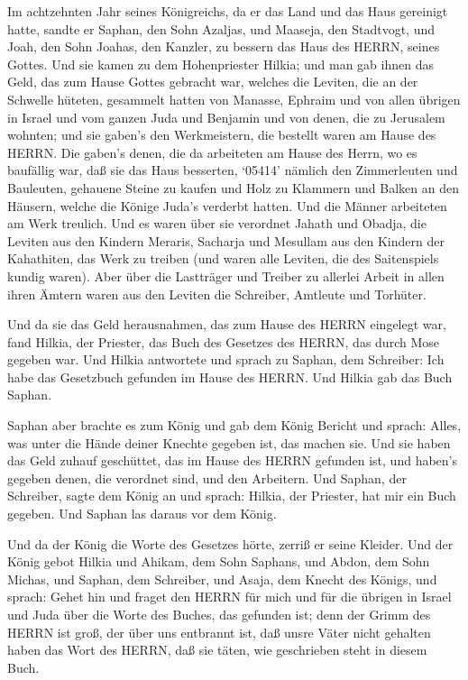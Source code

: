  Im achtzehnten Jahr seines Königreichs, da er das Land und
das Haus gereinigt hatte, sandte er Saphan, den Sohn Azaljas, und
Maaseja, den Stadtvogt, und Joah, den Sohn Joahas, den Kanzler, zu
bessern das Haus des HERRN, seines Gottes.  Und sie kamen zu
dem Hohenpriester Hilkia; und man gab ihnen das Geld, das zum Hause
Gottes gebracht war, welches die Leviten, die an der Schwelle hüteten,
gesammelt hatten von Manasse, Ephraim und von allen übrigen in Israel
und vom ganzen Juda und Benjamin und von denen, die zu Jerusalem
wohnten;  und sie gaben's den Werkmeistern, die bestellt
waren am Hause des HERRN. Die gaben's denen, die da arbeiteten am Hause
des Herrn, wo es baufällig war, daß sie das Haus besserten,
 `05414' nämlich den Zimmerleuten und Bauleuten, gehauene
Steine zu kaufen und Holz zu Klammern und Balken an den Häusern, welche
die Könige Juda's verderbt hatten.  Und die Männer
arbeiteten am Werk treulich. Und es waren über sie verordnet Jahath und
Obadja, die Leviten aus den Kindern Meraris, Sacharja und Mesullam aus
den Kindern der Kahathiten, das Werk zu treiben (und waren alle Leviten,
die des Saitenspiels kundig waren).  Aber über die
Lastträger und Treiber zu allerlei Arbeit in allen ihren Ämtern waren
aus den Leviten die Schreiber, Amtleute und Torhüter.

 Und da sie das Geld herausnahmen, das zum Hause des HERRN
eingelegt war, fand Hilkia, der Priester, das Buch des Gesetzes des
HERRN, das durch Mose gegeben war.  Und Hilkia antwortete
und sprach zu Saphan, dem Schreiber: Ich habe das Gesetzbuch gefunden im
Hause des HERRN. Und Hilkia gab das Buch Saphan.

 Saphan aber brachte es zum König und gab dem König Bericht
und sprach: Alles, was unter die Hände deiner Knechte gegeben ist, das
machen sie.  Und sie haben das Geld zuhauf geschüttet, das
im Hause des HERRN gefunden ist, und haben's gegeben denen, die
verordnet sind, und den Arbeitern.  Und Saphan, der
Schreiber, sagte dem König an und sprach: Hilkia, der Priester, hat mir
ein Buch gegeben. Und Saphan las daraus vor dem König.

 Und da der König die Worte des Gesetzes hörte, zerriß er
seine Kleider.  Und der König gebot Hilkia und Ahikam, dem
Sohn Saphans, und Abdon, dem Sohn Michas, und Saphan, dem Schreiber, und
Asaja, dem Knecht des Königs, und sprach:  Gehet hin und
fraget den HERRN für mich und für die übrigen in Israel und Juda über
die Worte des Buches, das gefunden ist; denn der Grimm des HERRN ist
groß, der über uns entbrannt ist, daß unsre Väter nicht gehalten haben
das Wort des HERRN, daß sie täten, wie geschrieben steht in diesem Buch.

